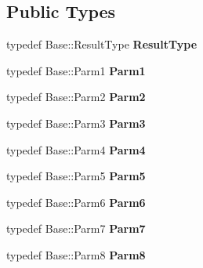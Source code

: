 \subsection*{Public Types}
\begin{DoxyCompactItemize}
\item 
\hypertarget{classLoki_1_1Chainer_a16a785b9efe9d611c5213690cb9ffad5}{}typedef Base\+::\+Result\+Type {\bfseries Result\+Type}\label{classLoki_1_1Chainer_a16a785b9efe9d611c5213690cb9ffad5}

\item 
\hypertarget{classLoki_1_1Chainer_a74bbefeb03ddb4aeeb1470df0261c673}{}typedef Base\+::\+Parm1 {\bfseries Parm1}\label{classLoki_1_1Chainer_a74bbefeb03ddb4aeeb1470df0261c673}

\item 
\hypertarget{classLoki_1_1Chainer_acd8aba10eac9fbe4588f5779071a397c}{}typedef Base\+::\+Parm2 {\bfseries Parm2}\label{classLoki_1_1Chainer_acd8aba10eac9fbe4588f5779071a397c}

\item 
\hypertarget{classLoki_1_1Chainer_a989243ed7e1166a85a8b694e3a989db9}{}typedef Base\+::\+Parm3 {\bfseries Parm3}\label{classLoki_1_1Chainer_a989243ed7e1166a85a8b694e3a989db9}

\item 
\hypertarget{classLoki_1_1Chainer_aea74fad61c2a3db99b5de1c191550310}{}typedef Base\+::\+Parm4 {\bfseries Parm4}\label{classLoki_1_1Chainer_aea74fad61c2a3db99b5de1c191550310}

\item 
\hypertarget{classLoki_1_1Chainer_ae39a48b8d3c6ff762843e01d920934f3}{}typedef Base\+::\+Parm5 {\bfseries Parm5}\label{classLoki_1_1Chainer_ae39a48b8d3c6ff762843e01d920934f3}

\item 
\hypertarget{classLoki_1_1Chainer_acad7f4810be65b8df4ccf6e243d99343}{}typedef Base\+::\+Parm6 {\bfseries Parm6}\label{classLoki_1_1Chainer_acad7f4810be65b8df4ccf6e243d99343}

\item 
\hypertarget{classLoki_1_1Chainer_a94d0e68a329b4bf771fb2519db7d2def}{}typedef Base\+::\+Parm7 {\bfseries Parm7}\label{classLoki_1_1Chainer_a94d0e68a329b4bf771fb2519db7d2def}

\item 
\hypertarget{classLoki_1_1Chainer_a2546bf5cd6c51e75f461df60052d333e}{}typedef Base\+::\+Parm8 {\bfseries Parm8}\label{classLoki_1_1Chainer_a2546bf5cd6c51e75f461df60052d333e}


\end{DoxyCompactItemize}
